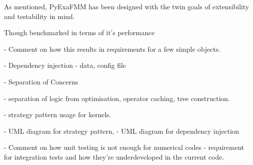 As mentioned, \gls{PyExaFMM} has been designed with the twin goals of extensibility
and testability in mind.

Though benchmarked in terms of it's performance

- Comment on how this results in requirements for a few simple objects.

- Dependency injection
    - data, config file

- Separation of Concerns

   - separation of logic from optimisation, operator caching,
       tree construction.

    - strategy pattern usage for kernels.

- UML diagram for strategy pattern,
- UML diagram for dependency injection

- Comment on how unit testing is not enough for numerical codes
    - requirement for integration tests and how they're underdeveloped in
    the current code.

